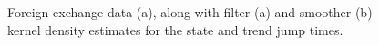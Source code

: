 \documentclass[journal]{IEEEtran}
\begin{document}
\begin{figure}[!t]
\centering
{} \\
 \\
\caption{Foreign exchange data (a), along with filter (a) and smoother (b) kernel density estimates for the state and trend jump times.}
\label{fig:fx_results}
\end{figure}
\end{document}
